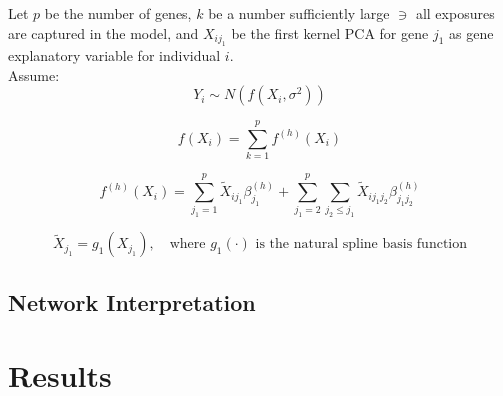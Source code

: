 \documentclass{article}\usepackage[]{graphicx}\usepackage[]{color}
\begin{document}
Let $p$ be the number of genes, $k$ be a number sufficiently large $\ni$ all exposures are captured in the model, and $X_{ij_1}$ be the first kernel PCA for gene $j_1$ as gene explanatory variable for individual $i$.\\

Assume:\\
\begin{equation}
Y_i \sim N(f(X_i, \sigma^2)) \tag{1.1}
\end{equation}

\begin{equation}
f(X_i) = \sum_{k=1}^p f^{(h)}(X_i) \tag{1.2}
\end{equation}

\begin{equation}
f^{(h)}(X_i) = \sum_{j_1 =1}^p \tilde{X}_{ij_1}\beta_{j_1}^{(h)} + \sum_{j_1 = 2}^p \sum_{j_2 \le j_1} \tilde{X}_{ij_1j_2}\beta_{j_1j_2}^{(h)} \tag{1.3}
\end{equation}

\begin{equation}
\tilde{X}_{j_1} = g_1(X_{j_1}), \quad \text{where } g_1(\cdot) \text{ is the natural spline basis function} \tag{1.4}
\end{equation}
\subsection{Network Interpretation}







\section{Results}
\end{document}
